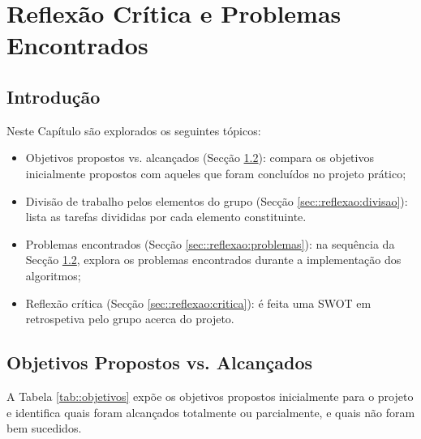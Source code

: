 \chapter{Reflexão Crítica e Problemas Encontrados}
\label{ch::reflexao}


\section{Introdução}
\label{sec::reflexao:intro}

Neste Capítulo são explorados os seguintes tópicos:

\begin{itemize}
	\item Objetivos propostos vs. alcançados (Secção \ref{sec::reflexao:objetivos}): compara os objetivos inicialmente propostos com aqueles que foram concluídos no projeto prático;
	
	\item Divisão de trabalho pelos elementos do grupo (Secção \ref{sec::reflexao:divisao}): lista as tarefas divididas por cada elemento constituinte.
	
	\item Problemas encontrados (Secção \ref{sec::reflexao:problemas}): na sequência da Secção \ref{sec::reflexao:objetivos}, explora os problemas encontrados durante a implementação dos algoritmos;
	
	\item Reflexão crítica (Secção \ref{sec::reflexao:critica}): é feita uma \ac{SWOT} em retrospetiva pelo grupo acerca do projeto.
\end{itemize}


\section{Objetivos Propostos vs. Alcançados}
\label{sec::reflexao:objetivos}

A Tabela \ref{tab::objetivos} expõe os objetivos propostos inicialmente para o projeto e identifica quais foram alcançados totalmente ou parcialmente, e quais não foram bem sucedidos.

